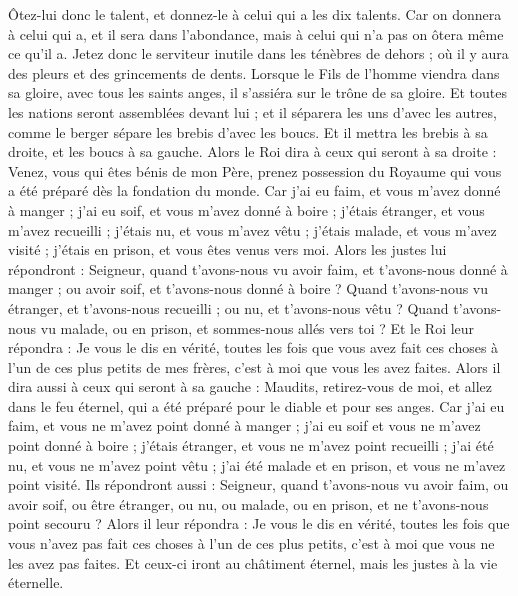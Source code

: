 \begin{multicols}{2}
Ôtez-lui donc le talent, et donnez-le à celui qui a les dix talents.
Car on donnera à celui qui a, et il sera dans l’abondance, mais à celui qui n’a pas on ôtera même ce qu’il a.
Jetez donc le serviteur inutile dans les ténèbres de dehors ; où il y aura des pleurs et des grincements de dents.
Lorsque le Fils de l'homme viendra dans sa gloire, avec tous les saints anges, il s'assiéra sur le trône de sa gloire.
Et toutes les nations seront assemblées devant lui ; et il séparera les uns d'avec les autres, comme le berger sépare les brebis d'avec les boucs.
Et il mettra les brebis à sa droite, et les boucs à sa gauche.
Alors le Roi dira à ceux qui seront à sa droite : Venez, vous qui êtes bénis de mon Père, prenez possession du Royaume qui vous a été préparé dès la fondation du monde.
Car j'ai eu faim, et vous m'avez donné à manger ; j'ai eu soif, et vous m'avez donné à boire ; j'étais étranger, et vous m'avez recueilli ;
j'étais nu, et vous m'avez vêtu ; j'étais malade, et vous m'avez visité ; j'étais en prison, et vous êtes venus vers moi.
Alors les justes lui répondront : Seigneur, quand t'avons-nous vu avoir faim, et t'avons-nous donné à manger ; ou avoir soif, et t'avons-nous donné à boire ?
Quand t'avons-nous vu étranger, et t'avons-nous recueilli ; ou nu, et t'avons-nous vêtu ?
Quand t'avons-nous vu malade, ou en prison, et sommes-nous allés vers toi ?
Et le Roi leur répondra : Je vous le dis en vérité, toutes les fois que vous avez fait ces choses à l'un de ces plus petits de mes frères, c’est à moi que vous les avez faites.
Alors il dira aussi à ceux qui seront à sa gauche : Maudits, retirez-vous de moi, et allez dans le feu éternel, qui a été préparé pour le diable et pour ses anges.
Car j'ai eu faim, et vous ne m'avez point donné à manger ; j'ai eu soif et vous ne m'avez point donné à boire ;
j'étais étranger, et vous ne m'avez point recueilli ; j'ai été nu, et vous ne m'avez point vêtu ; j'ai été malade et en prison, et vous ne m'avez point visité.
Ils répondront aussi : Seigneur, quand t’avons-nous vu avoir faim, ou avoir soif, ou être étranger, ou nu, ou malade, ou en prison, et ne t'avons-nous point secouru ?
Alors il leur répondra : Je vous le dis en vérité, toutes les fois que vous n'avez pas fait ces choses à l'un de ces plus petits, c’est à moi que vous ne les avez pas faites.
Et ceux-ci iront au châtiment éternel, mais les justes à la vie éternelle.

\end{multicols}

